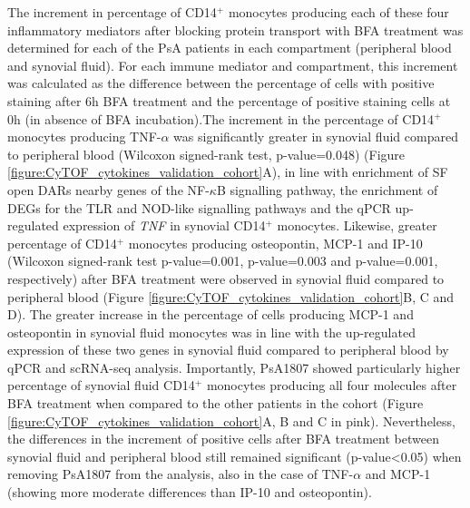 The increment in percentage of CD14$^+$ monocytes producing each of these four inflammatory mediators after blocking protein transport with BFA treatment was determined for each of the PsA patients in each compartment (peripheral blood and synovial fluid). For each immune mediator and compartment, this increment was calculated as the difference between the percentage of cells with positive staining after 6h BFA treatment and the percentage of positive staining cells at 0h (in absence of BFA incubation).The increment in the percentage of CD14$^+$ monocytes producing TNF-$\alpha$ was significantly greater in synovial fluid compared to peripheral blood (Wilcoxon signed-rank test, p-value=0.048) (Figure \ref{figure:CyTOF_cytokines_validation_cohort}A), in line with enrichment of SF open DARs nearby genes of the NF-$\kappa$B signalling pathway, the enrichment of DEGs for the TLR and NOD-like signalling pathways and the qPCR up-regulated expression of \textit{TNF} in synovial CD14$^+$ monocytes. %
Likewise, greater percentage of CD14$^+$ monocytes producing osteopontin, MCP-1 and IP-10 (Wilcoxon signed-rank test p-value=0.001, p-value=0.003 and p-value=0.001, respectively) after BFA treatment were observed in synovial fluid compared to peripheral blood (Figure \ref{figure:CyTOF_cytokines_validation_cohort}B, C and D). The greater increase in the percentage of cells producing MCP-1 and osteopontin in synovial fluid monocytes was in line with the up-regulated expression of these two genes in synovial fluid compared to peripheral blood by qPCR and scRNA-seq analysis. Importantly, PsA1807 showed particularly higher percentage of synovial fluid CD14$^+$ monocytes producing all four molecules after BFA treatment when compared to the other patients in the cohort (Figure \ref{figure:CyTOF_cytokines_validation_cohort}A, B and C in pink). Nevertheless, the differences in the increment of positive cells after BFA treatment between synovial fluid and peripheral blood still remained significant (p-value<0.05) when removing PsA1807 from the analysis, also in the case of TNF-$\alpha$ and MCP-1 (showing more moderate differences than IP-10 and osteopontin).



